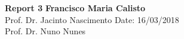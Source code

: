 \documentclass[a4paper, 11pt]{article}
\begin{document}
\noindent
\large\textbf{Report 3} \hfill \textbf{Francisco Maria Calisto} \\
\normalsize
Prof. Dr. Jacinto Nascimento \hfill Date: 16/03/2018 \\
Prof. Dr. Nuno Nunes





\clearpage



\end{document}
